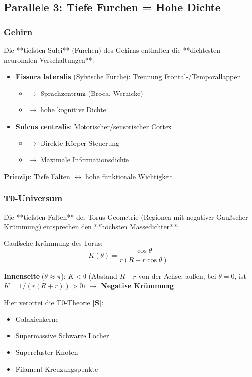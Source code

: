 	\subsection{Parallele 3: Tiefe Furchen = Hohe Dichte}

	\subsubsection{Gehirn}

	Die **tiefsten Sulci** (Furchen) des Gehirns enthalten die **dichtesten neuronalen Verschaltungen**:

	\begin{itemize}
		\item \textbf{Fissura lateralis} (Sylvische Furche): Trennung Frontal-/Temporallappen
		\begin{itemize}
			\item $\to$ Sprachzentrum (Broca, Wernicke)
			\item $\to$ hohe kognitive Dichte
		\end{itemize}
		\item \textbf{Sulcus centralis}: Motorischer/sensorischer Cortex
		\begin{itemize}
			\item $\to$ Direkte Körper-Steuerung
			\item $\to$ Maximale Informationsdichte
		\end{itemize}
	\end{itemize}

	\textbf{Prinzip}: Tiefe Falten $\leftrightarrow$ hohe funktionale Wichtigkeit

	\subsubsection{T0-Universum}

	Die **tiefsten Falten** der Torus-Geometrie (Regionen mit negativer Gaußscher Krümmung) entsprechen den **höchsten Massedichten**:

	Gaußsche Krümmung des Torus:
	\begin{equation}
		K(\theta) = \frac{\cos\theta}{r(R + r\cos\theta)}
	\end{equation}

	\textbf{Innenseite} ($\theta \approx \pi$): $K < 0$ (Abstand $R - r$ von der Achse; außen, bei $\theta = 0$, ist $K = 1/(r(R+r)) > 0$) $\to$ \textbf{Negative Krümmung}

	Hier verortet die T0-Theorie \textbf{[S]}:
	\begin{itemize}
		\item Galaxienkerne
		\item Supermassive Schwarze Löcher
		\item Supercluster-Knoten
		\item Filament-Kreuzungspunkte
	\end{itemize}

